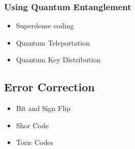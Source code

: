 



\subsubsection{Using Quantum Entanglement}
\begin{itemize}
    \item Superdense coding
    \item Quantum Teleportation
    \item Quantum Key Distribution
\end{itemize}



\subsection{Error Correction}
\begin{itemize}
    \item Bit and Sign Flip
    \item Shor Code
    \item Toric Codes
\end{itemize}
